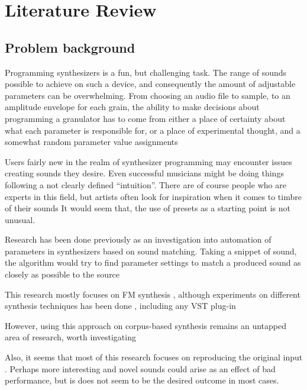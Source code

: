 \chapter{Literature Review}
\label{chapterlabel2}

\section{Problem background}
Programming synthesizers is a fun, but challenging task. The range of sounds possible to
achieve on such a device, and consequently the amount of adjustable parameters can be overwhelming.
From choosing an audio file to sample, to an amplitude envelope for each grain, the ability to make
decisions about programming a granulator has to come from either a place of certainty about what
each parameter is responsible for, or a place of experimental thought, and a somewhat random
parameter value assignments

Users fairly new in the realm of synthesizer programming may encounter issues creating sounds they
desire. Even successful musicians might be doing things following a not clearly defined “intuition”.
There are of course people who are experts in this field, but artists often look for inspiration
when it comes to timbre of their sounds%
It would seem that, the use of presets as a starting point is not unusual.


Research has been done previously as an investigation into automation of parameters in synthesizers
based on sound matching. Taking a snippet of sound, the algorithm would try to
find parameter settings to match a produced sound as closely as possible to the
source%

This research mostly focuses on FM synthesis
, although
experiments on different synthesis techniques has been
done
, including any VST
plug-in

However, using this approach on corpus-based synthesis remains an untapped area
of research, worth investigating

Also, it seems that most of this research focuses on reproducing the original
input
. Perhaps more interesting and novel sounds
could arise as an effect of bad performance, but is does not seem to be the
desired outcome in most cases.

